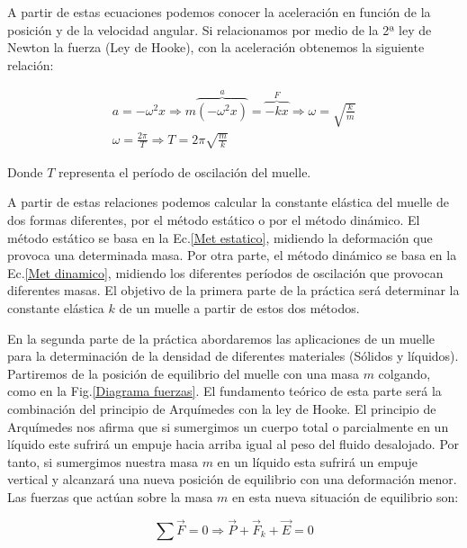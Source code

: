 \documentclass[a4paper,12pt,titlepage]{article}
\begin{document}
A partir de estas ecuaciones podemos conocer la aceleración en función de la posición y de la velocidad angular. Si relacionamos por medio de la 2ª ley de Newton la fuerza (Ley de Hooke), con la aceleración obtenemos la siguiente relación:

\begin{equation}
    \begin{gathered}
    a = -\omega^2 x \Rightarrow m\overbrace{(-\omega^2x)}^a = \overbrace{-kx}^F \Rightarrow \omega = \sqrt{\frac{k}{m}} \\
    \omega = \frac{2\pi}{T} \Rightarrow T= 2\pi \sqrt{\frac{m}{k}}
    \end{gathered}
    \label{Met dinamico}
\end{equation}

Donde $T$ representa el período de oscilación del muelle.

\par A partir de estas relaciones podemos calcular la constante elástica del muelle de dos formas diferentes, por el método estático o por el método dinámico. El método estático se basa en la Ec.\ref{Met estatico}, midiendo la deformación que provoca una determinada masa. Por otra parte, el método dinámico se basa en la Ec.\ref{Met dinamico}, midiendo los diferentes períodos de oscilación que provocan diferentes masas. El objetivo de la primera parte de la práctica será determinar la constante elástica $k$ de un muelle a partir de estos dos métodos.

\par En la segunda parte de la práctica abordaremos las aplicaciones de un muelle para la determinación de la densidad de diferentes materiales (Sólidos y líquidos). Partiremos de la posición de equilibrio del muelle con una masa $m$ colgando, como en la Fig.\ref{Diagrama fuerzas}. El fundamento teórico de esta parte será la combinación del principio de Arquímedes con la ley de Hooke. El principio de Arquímedes nos afirma que si sumergimos un cuerpo total o parcialmente en un líquido este sufrirá un empuje hacia arriba igual al peso del fluido desalojado. Por tanto, si sumergimos nuestra masa $m$ en un líquido esta sufrirá un empuje vertical y alcanzará una nueva posición de equilibrio con una deformación menor. Las fuerzas que actúan sobre la masa $m$ en esta nueva situación de equilibrio son:

\begin{equation}
    \sum \vec{F} = 0 \Rightarrow \vec{P} + \vec{F}_k + \vec{E} = 0
\end{equation}
\end{document}
